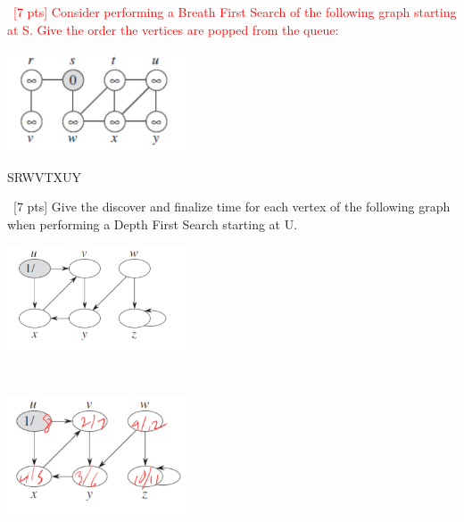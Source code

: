 \documentclass[12pt]{article}
\newenvironment{sol}[1][Solution]{\begin{trivlist}\item[\hskip\labelsep {\bfseries #1:}]}{\end{trivlist}}
\begin{document}
\begin{enumerate}
    \item \ \textcolor{red}{[7 pts] Consider performing a Breath First Search of the following graph starting at S. Give the order the vertices are popped from the queue:}
                 \begin{center}
            \includegraphics[width = 0.4\textwidth]{p3.png}
    \end{center}
    \begin{sol}
    SRWVTXUY
    \end{sol}

    \item \ [7 pts] Give the discover and finalize time for each vertex of the following graph when performing a Depth First Search starting at U.
                             \begin{center}
            \includegraphics[width = 0.4\textwidth]{p4.png}
    \end{center}
    \begin{sol}
    \hspace*{\fill}\\
                         \begin{center}
            \includegraphics[width = 0.4\textwidth]{p5.png}
    \end{center}
    \end{sol}


\end{enumerate}
\end{document}

